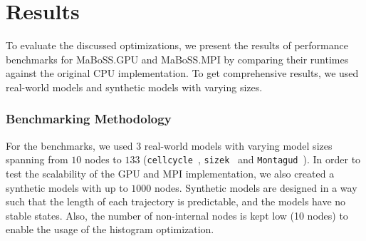 \documentclass[times, twoside]{zHenriquesLab-StyleBioRxiv}
\begin{document}


\section*{Results}

To evaluate the discussed optimizations, we present the results of performance benchmarks for MaBoSS.GPU and MaBoSS.MPI by comparing their runtimes against the original CPU implementation. To get comprehensive results, we used real-world models and synthetic models with varying sizes.

\subsubsection*{Benchmarking Methodology}

For the benchmarks, we used $3$ real-world models with varying model sizes spanning from $10$ nodes to $133$ (\texttt{cellcycle}~\cite{faure2006cellcycle}, \texttt{sizek}~\cite{sizek2019boolean} and \texttt{Montagud}~\cite{montagud2022prostate}). In order to test the scalability of the GPU and MPI implementation, we also created a synthetic models with up to $1000$ nodes. Synthetic models are designed in a way such that the length of each trajectory is predictable, and the models have no stable states. Also, the number of non-internal nodes is kept low (10 nodes) to enable the usage of the histogram optimization.
\end{document}
